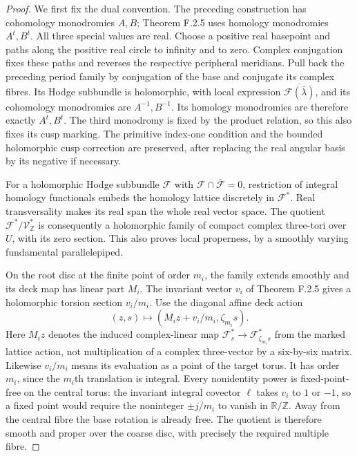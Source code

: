 \begin{proof}
We first fix the dual convention.  The preceding construction
has cohomology monodromies $A,B$; Theorem F.2.5 uses homology
monodromies $A^t,B^t$.  All three special values are real.
Choose a positive real basepoint and paths along the positive
real circle to infinity and to zero.  Complex conjugation fixes
these paths and reverses the respective peripheral meridians.
Pull back the preceding period family by conjugation of the
base and conjugate its complex fibres.  Its Hodge subbundle is
holomorphic, with local expression
$\overline{\mathcal F(\bar\lambda)}$, and its cohomology
monodromies are $A^{-1},B^{-1}$.  Its homology monodromies are
therefore exactly $A^t,B^t$.  The third monodromy is fixed by
the product relation, so this also fixes its cusp marking.
The primitive index-one condition and the bounded holomorphic
cusp correction are preserved, after replacing the real
angular basis by its negative if necessary.

For a holomorphic Hodge subbundle $\mathcal F$ with
$\mathcal F\cap\bar{\mathcal F}=0$, restriction of integral
homology functionals embeds the homology lattice discretely in
$\mathcal F^*$.  Real transversality makes its real span the
whole real vector space.  The quotient
$\mathcal F^*/\mathcal V_{\mathbb Z}^*$ is consequently a
holomorphic family of compact complex three-tori over $U$,
with its zero section.  This also proves local properness,
by a smoothly varying fundamental parallelepiped.

On the root disc at the finite point of order $m_i$, the family
extends smoothly and its deck map has linear part $M_i$.
The invariant vector $v_i$ of Theorem F.2.5 gives a holomorphic
torsion section $v_i/m_i$.  Use the diagonal affine deck action
\[
 (z,s)\longmapsto(M_i z+v_i/m_i,\zeta_{m_i}s).
 \tag{F.24}
\]
Here $M_i z$ denotes the induced complex-linear map
$\mathcal F_s^*\to\mathcal F_{\zeta_{m_i}s}^*$ from the marked
lattice action, not multiplication of a complex three-vector
by a six-by-six matrix.  Likewise $v_i/m_i$ means its evaluation
as a point of the target torus.
It has order $m_i$, since the $m_i$th translation is integral.
Every nonidentity power is fixed-point-free on the central
torus: the invariant integral covector $\ell$ takes $v_i$ to
$1$ or $-1$, so a fixed point would require the noninteger
$\pm j/m_i$ to vanish in $\mathbb R/\mathbb Z$.
Away from the central fibre the base rotation is already free.
The quotient is therefore smooth and proper over the coarse
disc, with precisely the required multiple fibre.


\end{proof}
